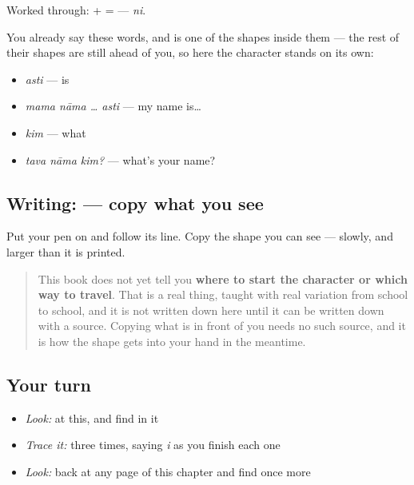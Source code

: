 Worked through: \textbf{} + \textbf{} = \textbf{} — \emph{ni}.

You already say these words, and  is one of the shapes inside them — the rest of their shapes are still ahead of you, so here the character stands on its own:

\begin{itemize}
\raggedright
  \item \emph{asti} — is
  \item \emph{mama nāma … asti} — my name is…
  \item \emph{kim} — what
  \item \emph{tava nāma kim?} — what's your name?
\end{itemize}

\subsection*{Writing:  — copy what you see}
Put your pen on  and follow its line. Copy the shape you can see — slowly, and larger than it is printed.

\begin{quote}
This book does not yet tell you \textbf{where to start the character or which way to travel}. That is a real thing, taught with real variation from school to school, and it is not written down here until it can be written down with a source. Copying what is in front of you needs no such source, and it is how the shape gets into your hand in the meantime.
\end{quote}

\subsection*{Your turn}
\begin{itemize}
\raggedright
  \item \emph{Look:} at this, and find  in it
\end{itemize}

\begin{quote}
\end{quote}

\begin{itemize}
\raggedright
  \item \emph{Trace it:}  three times, saying \emph{i} as you finish each one
  \item \emph{Look:} back at any page of this chapter and find  once more
\end{itemize}

